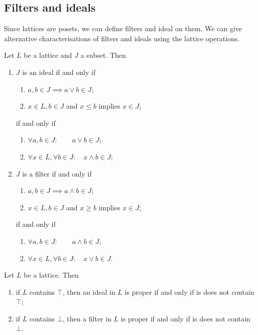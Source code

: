 \subsection{Filters and ideals}
Since lattices are posets, we can define filters and ideal on them.
We can give alternative characterisations of filters and ideals using the lattice operations.
\begin{lemma}
Let $L$ be a lattice and $J$ a subset. Then
\begin{enumerate}
\item $J$ is an ideal \textup{if and only if}
\begin{enumerate}
\item $a,b\in J \implies a\vee b\in J$;
\item $x\in L, b\in J$ and $x\leq b$ implies $x\in J$;
\end{enumerate}
\textup{if and only if}
\begin{enumerate}
\item $\forall a,b\in J: \qquad a\vee b\in J$;
\item $\forall x\in L, \forall b\in J: \quad x\wedge b \in J$;
\end{enumerate}
\item $J$ is a filter \textup{if and only if}
\begin{enumerate}
\item $a,b\in J \implies a\wedge b\in J$;
\item $x\in L, b\in J$ and $x\geq b$ implies $x\in J$;
\end{enumerate}
\textup{if and only if}
\begin{enumerate}
\item $\forall a,b\in J: \qquad a\wedge b\in J$;
\item $\forall x\in L, \forall b\in J: \quad x\vee b \in J$.
\end{enumerate}
\end{enumerate}
\end{lemma}

\begin{lemma}
Let $L$ be a lattice. Then
\begin{enumerate}
\item if $L$ contains $\top$, then an ideal in $L$ is proper \textup{if and only if} is does not contain $\top$;
\item if $L$ contains $\bot$, then a filter in $L$ is proper \textup{if and only if} is does not contain $\bot$.
\end{enumerate}
\end{lemma}

